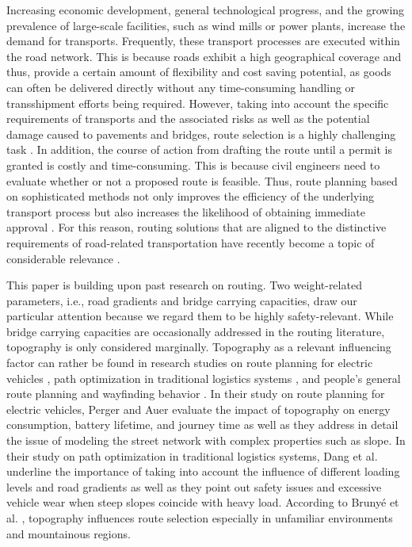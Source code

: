 %

Increasing economic development, general technological progress, and the growing prevalence of large-scale facilities, such as wind mills or power plants, increase the demand for \ohc transports.
Frequently, these transport processes are executed within the road network. This is because roads exhibit a high geographical coverage and thus, provide a certain amount of flexibility and cost saving potential, as goods can often be delivered directly without any time-consuming handling or transshipment efforts being required. However, taking into account the specific requirements of \ohc transports and the associated risks as well as the potential damage caused to pavements and bridges, \ohc route selection is a highly challenging task \cite{Bazaras.2013, xu2001methodology, sivilevicius2007dynamics, fiorillo2016minimizing, wu2019assessment, lou2016effect}. In addition, the course of action from drafting the route until a permit is granted is costly and time-consuming. This is because civil engineers need to evaluate whether or not a proposed route is feasible. Thus, route planning based on sophisticated methods not only improves the efficiency of the underlying transport process but also increases the likelihood of obtaining immediate approval \cite{meng2015optimized}. For this reason, routing solutions that are aligned to the distinctive requirements of road-related \ohc transportation have recently become a topic of considerable relevance \cite{geisberger2011efficient, yan2018optimal, zhu2014vehicle}.
\par
This paper is building upon past research on \ohc routing. Two weight-related parameters, i.e., road gradients and bridge carrying capacities, draw our particular attention because we regard them to be highly safety-relevant. While bridge carrying capacities are occasionally addressed in the \ohc routing literature, topography is only considered marginally. Topography as a relevant influencing factor can rather be found in research studies on route planning for electric vehicles \cite{perger2020energy}, path optimization in traditional logistics systems \cite{dang2019cost}, and people's general route planning and wayfinding behavior \cite{brunye2015strategies}. In their study on route planning for electric vehicles, Perger and Auer \cite{perger2020energy} evaluate the impact of topography on energy consumption, battery lifetime, and journey time as well as they address in detail the issue of modeling the street network with complex properties such as slope. In their study on path optimization in traditional logistics systems, Dang et al. \cite{dang2019cost} underline the importance of taking into account the influence of different loading levels and road gradients as well as they point out safety issues and excessive vehicle wear when steep slopes coincide with heavy load. According to Brunyé et al. \cite{brunye2015strategies}, topography influences route selection especially in unfamiliar environments and mountainous regions.
